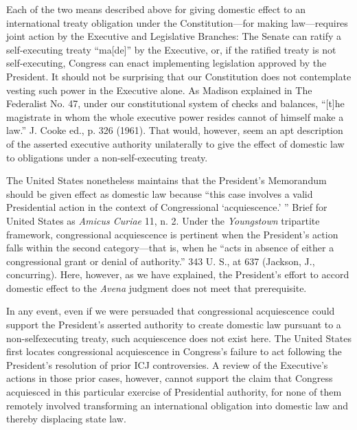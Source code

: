 {  Each of the two means described above for giving domestic effect
to an international treaty obligation under the Constitution---for
making law---requires joint action by the Executive and Legislative
Branches: The Senate can ratify a self-executing treaty ``ma[de]''
by the Executive, or, if the ratified treaty is not self-executing,
Congress can enact implementing legislation approved by the President.
It should not be surprising that our Constitution does not contemplate
vesting such power in the Executive alone. As Madison ex\newpage plained
in The Federalist No. 47, under our constitutional system of checks and
balances, ``[t]he magistrate in whom the whole executive power resides
cannot of himself make a law.'' J. Cooke ed., p. 326 (1961). That
would, however, seem an apt description of the asserted executive
authority unilaterally to give the effect of domestic law to obligations
under a non-self-executing treaty.

  The United States nonetheless maintains that the President's
Memorandum should be given effect as domestic law because ``this case
involves a valid Presidential action in the context of Congressional
‘acquiescence.' '' Brief for United States as \emph{Amicus Curiae}
11, n. 2. Under the \emph{Youngstown} tripartite framework, congressional
acquiescence is pertinent when the President's action falls within
the second category---that is, when he ``acts in absence of either
a congressional grant or denial of authority.'' 343 U. S., at 637
(Jackson, J., concurring). Here, however, as we have explained, the
President's effort to accord domestic effect to the \emph{Avena} judgment
does not meet that prerequisite.

  In any event, even if we were persuaded that congressional
acquiescence could support the President's asserted authority to
create domestic law pursuant to a non-selfexecuting treaty, such
acquiescence does not exist here. The United States first locates
congressional acquiescence in Congress's failure to act following the
President's resolution of prior ICJ controversies. A review of the
Executive's actions in those prior cases, however, cannot support
the claim that Congress acquiesced in this particular exercise of
Presidential authority, for none of them remotely involved transforming
an international obligation into domestic law and thereby displacing
state law.\footnotemark[14]


}
